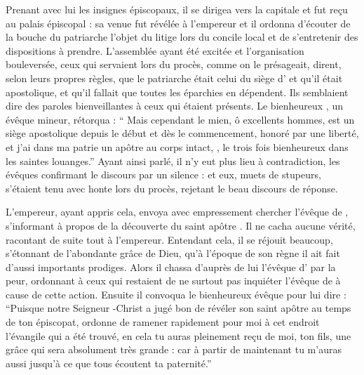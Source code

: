 Prenant avec lui les insignes épiscopaux,  il se dirigea vers la capitale et fut reçu au palais épiscopal : sa venue fut révélée à l'empereur  et   il ordonna d'écouter de la bouche du patriarche  l'objet du litige lors du concile local et de s'entretenir des dispositions à prendre. %
L'assemblée ayant été excitée et l'organisation bouleversée, ceux qui servaient lors du procès, comme on le présageait, dirent, selon leurs propres règles, que le patriarche était celui du siège d' et qu'il était apostolique, et qu'il fallait que toutes les éparchies en dépendent.
Ils semblaient dire des paroles bienveillantes à ceux qui étaient présents. 
Le bienheureux , un évêque mineur, rétorqua : \enquote{
Mais cependant le mien, ô excellents hommes, est un siège apostolique depuis le  début et dès le commencement,  %
honoré par une liberté, et j'ai dans ma patrie un apôtre au corps intact, , le trois fois bienheureux dans les saintes louanges.}
Ayant ainsi parlé, il n'y eut plus lieu à contradiction, les évêques confirmant le discours par un silence : et eux, muets de stupeurs, s'étaient tenu avec  honte lors du procès,  rejetant le beau discours de réponse.

L'empereur, ayant appris cela, envoya  avec empressement chercher  l'évêque de , s'informant à propos de la découverte du saint apôtre . 
Il ne cacha aucune vérité, racontant de suite  tout à l'empereur. 
Entendant cela, il se réjouit beaucoup, s'étonnant de l'abondante grâce de Dieu, qu'à l'époque de son règne il ait fait d'aussi importants prodiges.
Alors   il chassa d'auprès de lui l'évêque d' par la peur, ordonnant à ceux qui restaient de ne surtout pas inquiéter l'évêque  de  à cause de cette action. 
Ensuite il convoqua le bienheureux évêque  pour lui dire : 
\enquote{Puisque notre Seigneur -Christ a jugé bon de révéler son saint apôtre  au temps de ton épiscopat, ordonne de  ramener  rapidement pour moi à cet endroit l'évangile qui a été trouvé, en cela tu auras pleinement reçu de moi, ton fils, une grâce  qui sera absolument très grande :  %
car à partir de maintenant tu m'auras aussi  jusqu'à ce que tous écoutent ta paternité.}

